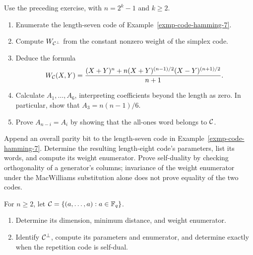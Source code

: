 
\begin{exo}
\label{exo-pol-enumerateur-hamming}
Use the preceding exercise, with $n=2^k-1$ and $k\geq2$.
\begin{enumerate}
\item Enumerate the length-seven code of Example~\ref{exmp-code-hamming-7}.
\item Compute $W_{\mathcal{C}^\bot}$ from the constant nonzero weight of the
simplex code.
\item Deduce the formula
\[
 W_{\mathcal{C}}(X,Y)=\frac{(X+Y)^n+n(X+Y)^{(n-1)/2}(X-Y)^{(n+1)/2}}{n+1}.
\]
\item Calculate $A_1,\ldots,A_6$, interpreting coefficients beyond the
length as zero. In particular, show that $A_3=n(n-1)/6$.
\item Prove $A_{n-i}=A_i$ by showing that the all-ones word belongs to
$\mathcal{C}$.
\end{enumerate}
\end{exo}


\begin{exo}
\label{exo-code-hamming-extended}
Append an overall parity bit to the length-seven code in
Example~\ref{exmp-code-hamming-7}. Determine the resulting length-eight
code's parameters, list its words, and compute its weight enumerator.
Prove self-duality by checking orthogonality of a generator's columns;
invariance of the weight enumerator under the MacWilliams substitution
alone does not prove equality of the two codes.
\end{exo}


\begin{exo}
\label{exo-code-repetition}
For $n\geq2$, let $\mathcal{C}=\{(a,\ldots,a):a\in\mathbb{F}_q\}$.
\begin{enumerate}
\item Determine its dimension, minimum distance, and weight enumerator.
\item Identify $\mathcal{C}^\bot$, compute its parameters and enumerator, and
determine exactly when the repetition code is self-dual.
\end{enumerate}
\end{exo}

